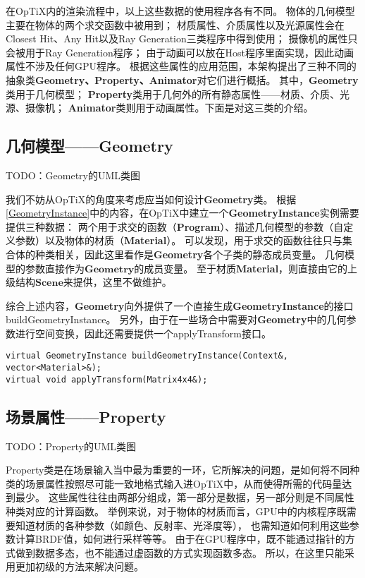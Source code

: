 在OpTiX内的渲染流程中，以上这些数据的使用程序各有不同。
物体的几何模型主要在物体的两个求交函数中被用到；
材质属性、介质属性以及光源属性会在Closest Hit、Any Hit以及Ray Generation三类程序中得到使用；
摄像机的属性只会被用于Ray Generation程序；
由于动画可以放在Host程序里面实现，因此动画属性不涉及任何GPU程序。
根据这些属性的应用范围，本架构提出了三种不同的抽象类\textbf{Geometry、Property、Animator}对它们进行概括。
其中，\textbf{Geometry}类用于几何模型；
\textbf{Property}类用于几何外的所有静态属性——材质、介质、光源、摄像机；
\textbf{Animator}类则用于动画属性。下面是对这三类的介绍。

\subsection{几何模型——Geometry}
TODO：Geometry的UML类图

我们不妨从OpTiX的角度来考虑应当如何设计\textbf{Geometry}类。
根据\ref{GeometryInstance}中的内容，在OpTiX中建立一个\textbf{GeometryInstance}实例需要提供三种数据：
两个用于求交的函数（\textbf{Program}）、描述几何模型的参数（自定义参数）以及物体的材质（\textbf{Material}）。
可以发现，用于求交的函数往往只与集合体的种类相关，因此这里看作是\textbf{Geometry}各个子类的静态成员变量。
几何模型的参数直接作为$\textbf{Geometry}$的成员变量。
至于材质\textbf{Material}，则直接由它的上级结构$\textbf{Scene}$来提供，这里不做维护。

综合上述内容，\textbf{Geometry}向外提供了一个直接生成\textbf{GeometryInstance}的接口buildGeometryInstance。
另外，由于在一些场合中需要对\textbf{Geometry}中的几何参数进行空间变换，因此还需要提供一个applyTransform接口。

\lstset{language=C++}
\begin{lstlisting}
virtual GeometryInstance buildGeometryInstance(Context&, vector<Material>&);
virtual void applyTransform(Matrix4x4&);
\end{lstlisting}

\subsection{场景属性——Property}
TODO：Property的UML类图

Property类是在场景输入当中最为重要的一环，它所解决的问题，是如何将不同种类的场景属性按照尽可能一致地格式输入进OpTiX中，从而使得所需的代码量达到最少。
这些属性往往由两部分组成，第一部分是数据，另一部分则是不同属性种类对应的计算函数。
举例来说，对于物体的材质而言，GPU中的内核程序既需要知道材质的各种参数（如颜色、反射率、光泽度等），
也需知道如何利用这些参数计算BRDF值，如何进行采样等等。
由于在GPU程序中，既不能通过指针的方式做到数据多态，也不能通过虚函数的方式实现函数多态。
所以，在这里只能采用更加初级的方法来解决问题。

